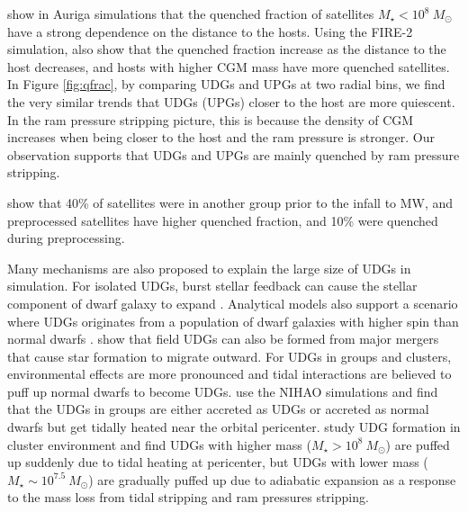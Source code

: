 \documentclass[twocolumn,astrosymb,twocolappendix]{aastex631}
\begin{document}
\begin{CJK*}{UTF8}{gbsn}
\citet{Simpson2018} show in Auriga simulations that the quenched fraction of satellites $M_\star < 10^8\ M_\odot$ have a strong dependence on the distance to the hosts. Using the FIRE-2 simulation, \citet{Samuel2022} also show that the quenched fraction increase as the distance to the host decreases, and hosts with higher CGM mass have more quenched satellites. In Figure \ref{fig:qfrac}, by comparing UDGs and UPGs at two radial bins, we find the very similar trends that UDGs (UPGs) closer to the host are more quiescent. In the ram pressure stripping picture, this is because the density of CGM increases when being closer to the host and the ram pressure is stronger. Our observation supports that UDGs and UPGs are mainly quenched by ram pressure stripping. 

\citet{Samuel2022} show that 40\% of satellites were in another group prior to the infall to MW, and preprocessed satellites have higher quenched fraction, and 10\% were quenched during preprocessing. 


Many mechanisms are also proposed to explain the large size of UDGs in simulation. For isolated UDGs, burst stellar feedback can cause the stellar component of dwarf galaxy to expand \citep[e.g.,][]{DiCintio2017,Chan2018,Martin2019,Jiang2019}. Analytical models also support a scenario where UDGs originates from a population of dwarf galaxies with higher spin than normal dwarfs \citep{Dalcanton1997,Amorisco2016,Rong2017,Liao2019}. \citet{Wright2021} show that field UDGs can also be formed from major mergers that cause star formation to
migrate outward. For UDGs in groups and clusters, environmental effects are more pronounced and tidal interactions are believed to puff up normal dwarfs to become UDGs. \citet{Jiang2019} use the NIHAO simulations and find that the UDGs in groups are either accreted as UDGs or accreted as normal dwarfs but get tidally heated near the orbital pericenter. \citet{Tremmel2020} study UDG formation in cluster environment and find UDGs with higher mass ($M_\star > 10^{8}\ M_\odot$) are puffed up suddenly due to tidal heating at pericenter, but UDGs with lower mass ($M_\star \sim 10^{7.5}\ M_\odot$) are gradually puffed up due to adiabatic expansion as a response to the mass loss from tidal stripping and ram pressures stripping. 


\end{CJK*}
\end{document}
